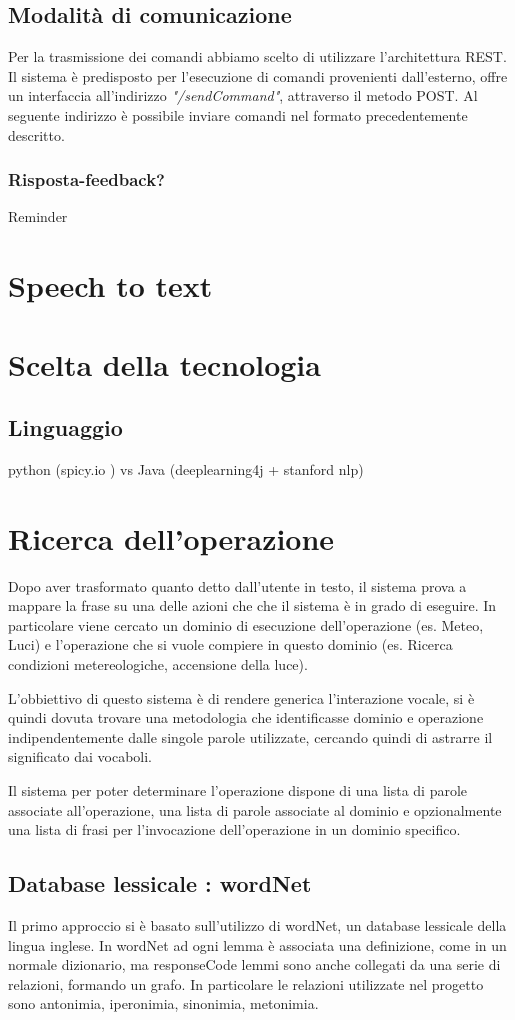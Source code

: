\documentclass[twoside]{supsistudent}
\begin{document}
\section{Modalità di comunicazione}
Per la trasmissione dei comandi abbiamo scelto di utilizzare l'architettura REST.
Il sistema è predisposto per l'esecuzione di comandi provenienti dall'esterno, offre un interfaccia all'indirizzo  \textit{"/sendCommand"}, attraverso il metodo POST.
Al seguente indirizzo è possibile inviare comandi nel formato precedentemente descritto.
\subsection{Risposta-feedback?}
Reminder
\chapter{Speech to text}
\chapter{Scelta della tecnologia}
\section{Linguaggio}
python (spicy.io ) vs Java (deeplearning4j + stanford nlp)
\chapter{Ricerca dell'operazione}
Dopo aver trasformato quanto detto dall'utente in testo, il sistema prova a mappare la frase su una delle azioni che che il sistema è in grado di eseguire.
In particolare viene cercato un dominio di esecuzione dell'operazione (es. Meteo, Luci) e l'operazione che si vuole compiere in questo dominio (es. Ricerca condizioni metereologiche, accensione della luce).


L'obbiettivo di questo sistema è di rendere generica l'interazione vocale, si è quindi dovuta trovare una metodologia che identificasse dominio e operazione indipendentemente dalle singole parole utilizzate, cercando quindi di astrarre il significato dai vocaboli.

 Il sistema per poter determinare l'operazione dispone di una lista di parole associate all'operazione, una lista di parole associate al dominio e opzionalmente una lista di frasi per l'invocazione dell'operazione in un dominio specifico.

\section{Database lessicale : wordNet}
Il primo approccio si è basato sull'utilizzo di wordNet, un database lessicale della lingua inglese.
In wordNet ad ogni lemma è associata una definizione, come in un normale dizionario, ma responseCode lemmi sono anche collegati da una serie di relazioni, formando un grafo. In particolare le relazioni utilizzate nel progetto sono antonimia, iperonimia, sinonimia, metonimia.\cite{wordNet}
\end{document}
